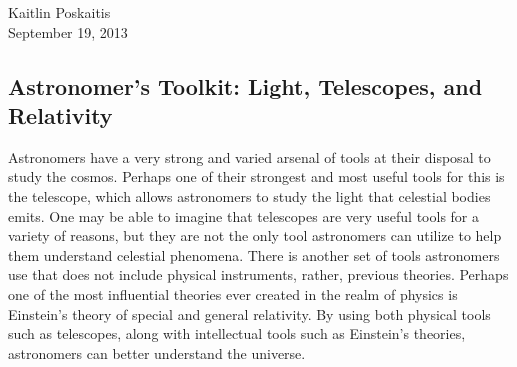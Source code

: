 \documentclass[12pt]{article}
\begin{document}
\noindent Kaitlin Poskaitis\\
September 19, 2013
\begin{center}
\section*{\bf Astronomer’s Toolkit: Light, Telescopes, and Relativity}
\end{center}

Astronomers have a very strong and varied arsenal of tools at their disposal to
study the cosmos.  Perhaps one of their strongest and most useful tools for this
is the telescope, which allows astronomers to study the light that celestial
bodies emits.  One may be able to imagine that telescopes are very useful tools
for a variety of reasons, but they are not the only tool astronomers can utilize
to help them understand celestial phenomena.  There is another set of tools
astronomers use that does not include physical instruments, rather, previous
theories.  Perhaps one of the most influential theories ever created in the
realm of physics is Einstein's theory of special and general relativity.  By
using both physical tools such as telescopes, along with intellectual tools such
as Einstein's theories, astronomers can better understand the universe.
\end{document}
